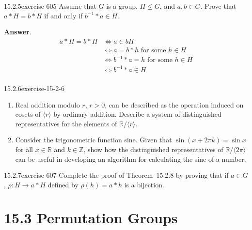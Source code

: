\documentclass[twoside,10pt,]{book}
\numberwithin{equation}{section}
\begin{document}
\begin{divisionsolution}{15.2.5}{}{exercise-605}%
\hypertarget{p-5424}{}%
Assume that \(G\) is a group, \(H \leq  G\), and \(a, b \in  G\).  Prove that \(a*H= b*H\)  if and only if  \(b^{-1}*a \in H\).%
\par\smallskip%
\noindent\textbf{Answer}.\quad%
\hypertarget{p-5425}{}%
%
\begin{equation*}
\begin{split}
a*H= b*H &\Leftrightarrow a \in b H\\
&\Leftrightarrow  a = b * h \textrm{      for  some }h \in H\\
&\Leftrightarrow b^{-1}*a = h \textrm{    for some }h \in H\\
& \Leftrightarrow  b^{-1}*a \in  H\\
\end{split}
\end{equation*}
%
\end{divisionsolution}%
\begin{divisionsolution}{15.2.6}{}{exercise-15-2-6}%
\hypertarget{p-5426}{}%
\leavevmode%
\begin{enumerate}[label=(\alph*)]
\item\hypertarget{li-2422}{}\hypertarget{p-5427}{}%
Real addition modulo \(r\),  \(r > 0\), can be described as the operation induced on cosets of \(\langle r\rangle\) by ordinary addition. Describe a system of distinguished representatives for the elements of \(\mathbb{R}/\langle r\rangle\).%
\item\hypertarget{li-2423}{}\hypertarget{p-5428}{}%
Consider the trigonometric function sine. Given that \(\sin (x+2\pi k) = \sin  x\) for all \(x\in \mathbb{R}\) and \(k\in \mathbb{Z}\), show how the distinguished representatives of \(\mathbb{R}/\langle 2\pi \rangle\) can be useful in developing an algorithm for calculating the sine of a number.%
\end{enumerate}
%
\end{divisionsolution}%
\begin{divisionsolution}{15.2.7}{}{exercise-607}%
\hypertarget{p-5429}{}%
Complete the proof of Theorem~15.2.8 by proving that if \(a \in  G\), \(\rho:H \to  a*H\) defined by \(\rho(h)= a*h\) is a bijection.%
\end{divisionsolution}%
\section*{15.3 Permutation Groups}
\end{document}
